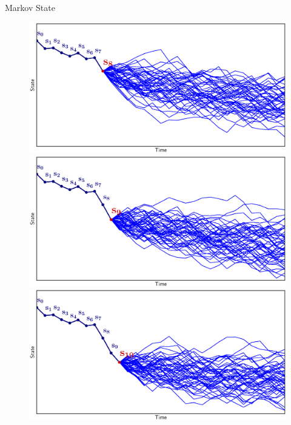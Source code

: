 \documentclass[lecture]{beamer}
\begin{document}
\begin{frame}{\normalsize Markov State}
\begin{overlayarea}{\textwidth}{0.55\textheight}
\begin{figure}
{        }%
        {%
          \includegraphics[width=\FS\textwidth,clip]{Codes/Basics/Markov8.eps}
        }%
        {%
          \includegraphics[width=\FS\textwidth,clip]{Codes/Basics/Markov9.eps}
        }%
        {%
          \includegraphics[width=\FS\textwidth,clip]{Codes/Basics/Markov10.eps}
        }%
        \end{figure}
        \end{overlayarea}
        

\end{frame}
\end{document}

